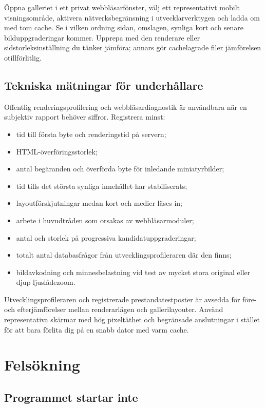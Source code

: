 \documentclass[11pt,a4paper]{article}
\begin{document}
Öppna galleriet i ett privat webbläsarfönster, välj ett representativt mobilt
visningsområde, aktivera nätverksbegränsning i utvecklarverktygen och ladda om
med tom cache. Se i vilken ordning sidan, omslagen, synliga kort och senare
bilduppgraderingar kommer. Upprepa med den renderare eller
sidstorleksinställning du tänker jämföra; annars gör cachelagrade filer
jämförelsen otillförlitlig.

\subsection{Tekniska mätningar för underhållare}

Offentlig renderingsprofilering och webbläsardiagnostik är användbara när en
subjektiv rapport behöver siffror. Registrera minst:

\begin{itemize}
  \item tid till första byte och renderingstid på servern;
  \item HTML-överföringsstorlek;
  \item antal begäranden och överförda byte för inledande miniatyrbilder;
  \item tid tills det största synliga innehållet har stabiliserats;
  \item layoutförskjutningar medan kort och medier läses in;
  \item arbete i huvudtråden som orsakas av webbläsarmoduler;
  \item antal och storlek på progressiva kandidatuppgraderingar;
  \item totalt antal databasfrågor från utvecklingsprofileraren där den finns;
  \item bildavkodning och minnesbelastning vid test av mycket stora original
  eller djup ljuslådezoom.
\end{itemize}

Utvecklingsprofileraren och registrerade prestandatestposter är avsedda för
före- och efterjämförelser mellan renderarlägen och gallerilayouter. Använd
representativa skärmar med hög pixeltäthet och begränsade anslutningar i stället
för att bara förlita dig på en snabb dator med varm cache.
\section{Felsökning}
\label{sec:troubleshooting}

\subsection{Programmet startar inte}
\end{document}
